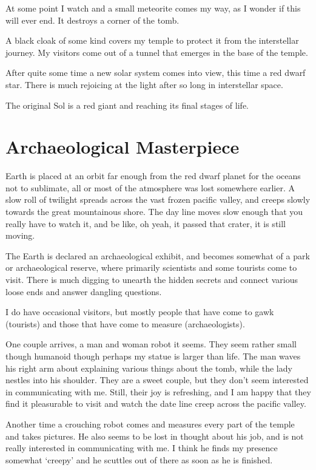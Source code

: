 At some point I watch and a small meteorite comes my way, as I wonder if this
will ever end.  It destroys a corner of the tomb. 

A black cloak of some kind covers my temple to protect it from the interstellar
journey. My visitors come out of a tunnel that emerges in the base of the temple. 

After quite some time a new solar system comes into view, this time a red dwarf
star. There is much rejoicing at the light after so long in interstellar space. 

The original Sol is a red giant and reaching its final stages of life. 

\section{Archaeological Masterpiece}

Earth is placed at an orbit far enough from the red dwarf planet for the
oceans not to sublimate, all or most of the atmosphere was lost somewhere
earlier. A slow roll of twilight spreads across the vast frozen pacific valley,
and creeps slowly towards the great mountainous shore. The day line moves slow 
enough that you really have to watch it, and be like, oh yeah, it passed that 
crater, it is still moving. 

The Earth is declared an archaeological exhibit, and becomes somewhat of a park
or archaeological reserve, where primarily scientists and some tourists come to
visit. There is much digging to unearth the hidden secrets and connect various
loose ends and answer dangling questions. 

I do have occasional visitors, but mostly people that have come to gawk 
(tourists) and those that have come to measure (archaeologists).

One couple arrives, a man and woman robot it seems. They seem rather small
though humanoid though perhaps my statue is larger than life. The man waves his 
right arm about explaining various things about the tomb, while the lady 
nestles into his shoulder. They are a sweet couple, but they don't seem 
interested in communicating with me. Still, their joy is refreshing, and I am
happy that they find it pleasurable to visit and watch the date line creep
across the pacific valley. 

Another time a crouching robot comes and measures every part of the temple and
takes pictures. He also seems to be lost in thought about his job, and is not
really interested in communicating with me. I think he finds my presence
somewhat `creepy' and he scuttles out of there as soon as he is finished. 

